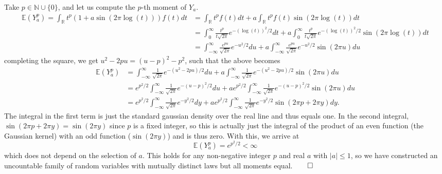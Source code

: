 \documentclass[10pt]{article}
\newcommand{\E}{\mathbb{E}}
\newcommand{\mbb}[1]{\mathbb{#1}}
\newcommand{\1}[1]{\mathbbm{1}_{#1}}
\begin{document}
    Take $p\in\mbb{N}\cup\{0\}$, and let us compute the $p$-th moment of $Y_a$.
    \begin{align*}
        \E{(Y_a^p)}=\int_\mbb{R}t^p(1+a\sin(2\pi\log(t)))f(t)dt&=\int_\mbb{R}t^pf(t)dt+a\int_\mbb{R}t^pf(t)\sin(2\pi\log(t))dt\\
        &=\int_0^\infty\frac{t^p}{t\sqrt{2\pi}}e^{-(\log(t))^2/2}dt+a\int_0^\infty\frac{t^p}{t\sqrt{2\pi}}e^{-(\log(t))^2/2}\sin(2\pi\log(t))dt\\
        &=\int_{-\infty}^\infty \frac{e^{pu}}{\sqrt{2\pi}}e^{-u^2/2}du+a\int_{-\infty}^\infty\frac{e^{pu}}{\sqrt{2\pi}}e^{-u^2/2}\sin(2\pi u)du\tag{setting $u=\log(t)$}
    \end{align*}
    completing the square, we get $u^2-2pu=(u-p)^2-p^2$, such that the above becomes
    \begin{align*}
        \E{(Y_a^p)}&=\int_{-\infty}^\infty \frac{1}{\sqrt{2\pi}}e^{-(u^2-2pu)/2}du+a\int_{-\infty}^\infty\frac{1}{\sqrt{2\pi}}e^{-(u^2-2pu)/2}\sin(2\pi u)du\\
        &=e^{p^2/2}\int_{-\infty}^\infty \frac{1}{\sqrt{2\pi}}e^{-(u-p)^2/2}du+ae^{p^2/2}\int_{-\infty}^\infty\frac{1}{\sqrt{2\pi}}e^{-(u-p)^2/2}\sin(2\pi u)du\\
        &=e^{p^2/2}\int_{-\infty}^\infty \frac{1}{\sqrt{2\pi}}e^{-y^2/2}dy+ae^{p^2/2}\int_{-\infty}^\infty\frac{1}{\sqrt{2\pi}}e^{-y^2/2}\sin(2\pi p+2\pi y)dy.
    \end{align*}
    The integral in the first term is just the standard gaussian density over the real line and thus equals one. In the second integral, $\sin(2\pi p+2\pi y)=\sin(2\pi y)$ since $p$ is a fixed integer, so this is actually just the integral of the product of an even function (the Gaussian kernel) with an odd function ($\sin(2\pi y)$) and is thus zero. With this, we arrive at
    \[\E{(Y_a^p)}=e^{p^2/2}<\infty\]
    which does not depend on the selection of $a$. This holds for any non-negative integer $p$ and real $a$ with $|a|\leq 1$, so we have constructed an uncountable family of random variables with mutually distinct laws but all moments equal.\hfill{$\qed$}\\[5pt]
\end{document}
